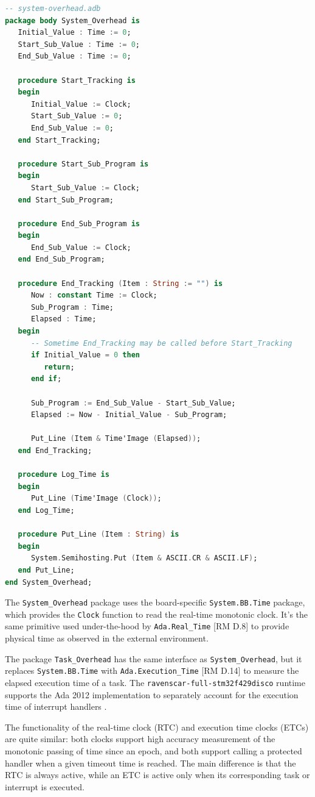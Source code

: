 \documentclass{article}
\begin{document}
\begin{lstlisting}[language=Ada]
-- system-overhead.adb
package body System_Overhead is
   Initial_Value : Time := 0;
   Start_Sub_Value : Time := 0;
   End_Sub_Value : Time := 0;

   procedure Start_Tracking is
   begin
      Initial_Value := Clock;
      Start_Sub_Value := 0;
      End_Sub_Value := 0;
   end Start_Tracking;

   procedure Start_Sub_Program is
   begin
      Start_Sub_Value := Clock;
   end Start_Sub_Program;

   procedure End_Sub_Program is
   begin
      End_Sub_Value := Clock;
   end End_Sub_Program;

   procedure End_Tracking (Item : String := "") is
      Now : constant Time := Clock;
      Sub_Program : Time;
      Elapsed : Time;
   begin
      -- Sometime End_Tracking may be called before Start_Tracking
      if Initial_Value = 0 then
         return;
      end if;

      Sub_Program := End_Sub_Value - Start_Sub_Value;
      Elapsed := Now - Initial_Value - Sub_Program;

      Put_Line (Item & Time'Image (Elapsed));
   end End_Tracking;

   procedure Log_Time is
   begin
      Put_Line (Time'Image (Clock));
   end Log_Time;

   procedure Put_Line (Item : String) is
   begin
      System.Semihosting.Put (Item & ASCII.CR & ASCII.LF);
   end Put_Line;
end System_Overhead;
\end{lstlisting}

The \texttt{System\_Overhead} package uses the board-specific \texttt{System.BB.Time} package, which provides the \texttt{Clock} function to read the real-time monotonic clock. It's the same primitive used under-the-hood by \texttt{Ada.Real\_Time} [RM D.8] to provide physical time as observed in the external environment.

The package \texttt{Task\_Overhead} has the same interface as \texttt{System\_Overhead}, but it replaces \texttt{System.BB.Time} with \texttt{Ada.Execution\_Time} [RM D.14] to measure the elapsed execution time of a task. The \texttt{ravenscar-full-stm32f429disco} runtime supports the Ada 2012 implementation to separately account for the execution time of interrupt handlers \cite{etc}.

The functionality of the real-time clock (RTC) and execution time clocks (ETCs) are quite similar: both clocks support high accuracy measurement of the monotonic passing of time since an epoch, and both support calling a protected handler when a given timeout time is reached. The main difference is that the RTC is always active, while an ETC is active only when its corresponding task or interrupt is executed.
\end{document}
